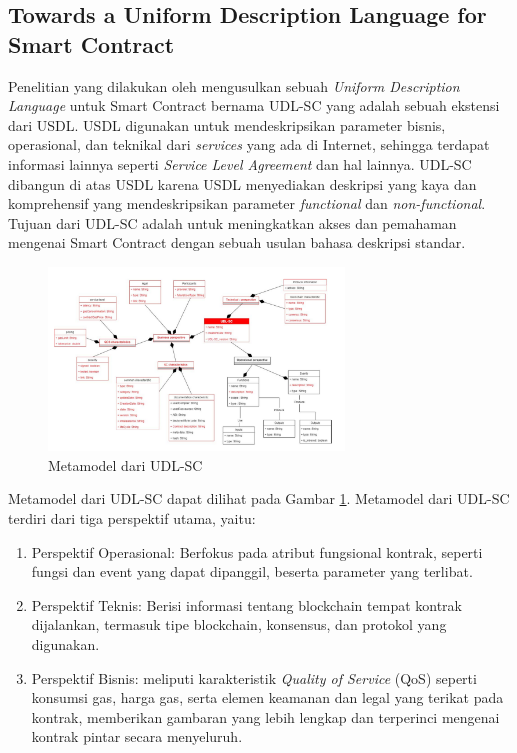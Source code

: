\subsection{Towards a Uniform Description Language for Smart Contract}
\label{subsec:uniform-description-language}

Penelitian yang dilakukan oleh \cite{udlsc} mengusulkan sebuah \textit{Uniform Description Language} untuk Smart Contract bernama UDL-SC yang adalah sebuah ekstensi dari USDL. USDL digunakan untuk mendeskripsikan parameter bisnis, operasional, dan teknikal dari \textit{services} yang ada di Internet, sehingga terdapat informasi lainnya seperti \textit{Service Level Agreement} dan hal lainnya. UDL-SC dibangun di atas USDL karena USDL menyediakan deskripsi yang kaya dan komprehensif yang mendeskripsikan parameter \textit{functional} dan \textit{non-functional}. Tujuan dari UDL-SC adalah untuk meningkatkan akses dan pemahaman mengenai Smart Contract dengan sebuah usulan bahasa deskripsi standar.

\begin{figure}[ht]
	\centering
	\includegraphics[width=0.7\textwidth]{resources/chapter-2/metamodel-udl-sc.png}
	\caption{Metamodel dari UDL-SC \parencite{udlsc}}
	\label{image:metamodel-udl-sc}
\end{figure}

Metamodel dari UDL-SC dapat dilihat pada Gambar \ref{image:metamodel-udl-sc}. Metamodel dari UDL-SC terdiri dari tiga perspektif utama, yaitu:

\begin{enumerate}
	\item Perspektif Operasional: Berfokus pada atribut fungsional kontrak, seperti fungsi dan event yang dapat dipanggil, beserta parameter yang terlibat.
	\item Perspektif Teknis: Berisi informasi tentang blockchain tempat kontrak dijalankan, termasuk tipe blockchain, konsensus, dan protokol yang digunakan.
	\item Perspektif Bisnis: meliputi karakteristik \textit{Quality of Service} (QoS) seperti konsumsi gas, harga gas, serta elemen keamanan dan legal yang terikat pada kontrak, memberikan gambaran yang lebih lengkap dan terperinci mengenai kontrak pintar secara menyeluruh.
\end{enumerate}

